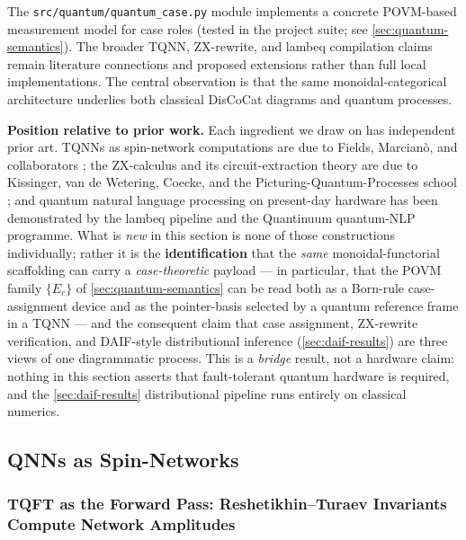 \documentclass[
]{article}
\newcounter{none} %
\begin{document}
The \texttt{src/quantum/quantum\_case.py} module implements a concrete
POVM-based measurement model for case roles (tested in the project
suite; see \autoref{sec:quantum-semantics}). The broader TQNN,
ZX-rewrite, and lambeq compilation claims remain literature connections
and proposed extensions rather than full local implementations. The
central observation is that the same monoidal-categorical architecture
underlies both classical DisCoCat diagrams and quantum processes.

\textbf{Position relative to prior work.} Each ingredient we draw on has
independent prior art. TQNNs as spin-network computations are due to
Fields, Marcianò, and collaborators
\citep{fields2022tqnn, fields2025amplituhedra}; the ZX-calculus and its
circuit-extraction theory are due to Kissinger, van de Wetering, Coecke,
and the Picturing-Quantum-Processes school
\citep{kissinger2020zx, coeckekissinger2017}; and quantum natural
language processing on present-day hardware has been demonstrated by the
lambeq pipeline \citep{lorenz2021lambeq} and the Quantinuum quantum-NLP
programme. What is \emph{new} in this section is none of those
constructions individually; rather it is the \textbf{identification}
that the \emph{same} monoidal-functorial scaffolding can carry a
\emph{case-theoretic} payload --- in particular, that the POVM family
\(\{E_c\}\) of \autoref{sec:quantum-semantics} can be read both as a
Born-rule case-assignment device and as the pointer-basis selected by a
quantum reference frame in a TQNN --- and the consequent claim that case
assignment, ZX-rewrite verification, and DAIF-style distributional
inference (\autoref{sec:daif-results}) are three views of one
diagrammatic process. This is a \emph{bridge} result, not a hardware
claim: nothing in this section asserts that fault-tolerant quantum
hardware is required, and the \autoref{sec:daif-results} distributional
pipeline runs entirely on classical numerics.

\subsection{QNNs as Spin-Networks}\label{qnns-as-spin-networks}

\subsubsection{TQFT as the Forward Pass: Reshetikhin--Turaev Invariants
Compute Network
Amplitudes}\label{tqft-as-the-forward-pass-reshetikhinturaev-invariants-compute-network-amplitudes}
\end{document}
